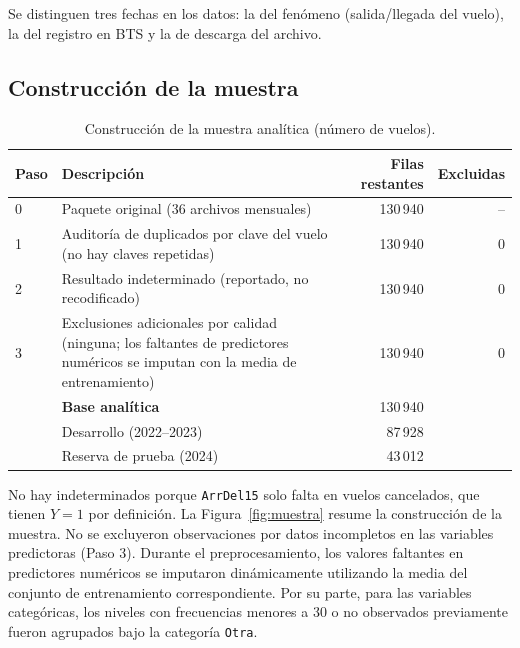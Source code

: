 \documentclass[11pt,a4paper]{article}
\newcommand{\code}[1]{\texttt{#1}}
\begin{document}
Se distinguen tres fechas en los datos: la del fenómeno (salida/llegada del vuelo), la del registro en BTS y la de descarga del archivo.
 
\subsection{Construcción de la muestra}
\begin{table}[ht]
\centering
\caption{Construcción de la muestra analítica (número de vuelos).}
\label{tab:muestra}
\begin{tabularx}{\textwidth}{@{}lXrr@{}}
\toprule
Paso & Descripción & Filas restantes & Excluidas \\
\midrule
0 & Paquete original (36 archivos mensuales) & 130\,940 & -- \\
1 & Auditoría de duplicados por clave del vuelo (no hay claves repetidas) & 130\,940 & 0 \\
2 & Resultado indeterminado (reportado, no recodificado) & 130\,940 & 0 \\
3 & Exclusiones adicionales por calidad (ninguna; los faltantes de predictores numéricos se imputan con la media de entrenamiento) & 130\,940 & 0 \\
\midrule
 & \textbf{Base analítica} & 130\,940 & \\
 & \quad Desarrollo (2022--2023) & 87\,928 & \\
 & \quad Reserva de prueba (2024) & 43\,012 & \\
\bottomrule
\end{tabularx}
\end{table}
 
No hay indeterminados porque \code{ArrDel15} solo falta en vuelos cancelados, que tienen $Y=1$ por definición. La Figura~\ref{fig:muestra} resume la construcción de la muestra. No se excluyeron observaciones por datos incompletos en las variables predictoras (Paso 3). Durante el preprocesamiento, los valores faltantes en predictores numéricos se imputaron dinámicamente utilizando la media del conjunto de entrenamiento correspondiente. Por su parte, para las variables categóricas, los niveles con frecuencias menores a 30 o no observados previamente fueron agrupados bajo la categoría \texttt{Otra}.
 
\end{document}
